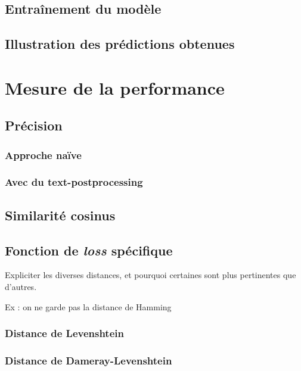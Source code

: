 \documentclass{report}
\begin{document}
        \section{Entraînement du modèle}

        \section{Illustration des prédictions obtenues}


    \chapter{Mesure de la performance}
    
        \section{Précision}
            \subsection{Approche naïve}

            \subsection{Avec du \og text-postprocessing \fg}
        
        \section{Similarité cosinus}

        \section{Fonction de \emph{loss} spécifique}

        Expliciter les diverses distances, et pourquoi certaines sont plus pertinentes que d'autres.

        Ex : on ne garde pas la distance de Hamming
            \subsection{Distance de Levenshtein}

            \subsection{Distance de Dameray-Levenshtein}
\end{document}
